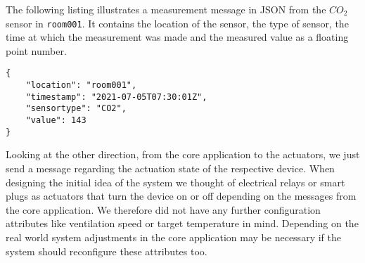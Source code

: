 The following listing illustrates a measurement message in JSON from the $CO_2$ sensor in \texttt{room001}.
It contains the location of the sensor, the type of sensor, the time at which the measurement was made and the measured value as a floating point number.

\begin{verbatim}
{
    "location": "room001",
    "timestamp": "2021-07-05T07:30:01Z",
    "sensortype": "CO2",
    "value": 143
}
\end{verbatim}
Looking at the other direction, from the core application to the actuators, we just send a message regarding the actuation state of the respective device.
When designing the initial idea of the system we thought of electrical relays or smart plugs as actuators that turn the device on or off depending on the messages from the core application.
We therefore did not have any further configuration attributes like ventilation speed or target temperature in mind.
Depending on the real world system adjustments in the core application may be necessary if the system should reconfigure these attributes too.

\pagebreak